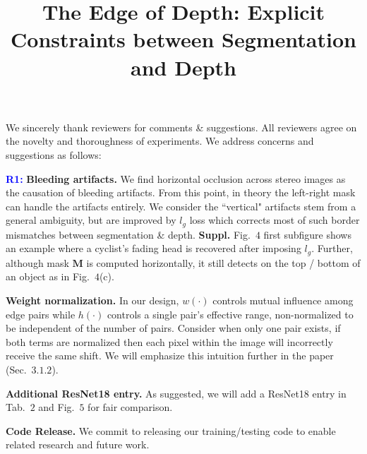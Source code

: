 \documentclass[10pt,twocolumn,letterpaper]{article}
\newcommand{\Paragraph}[1]{\vspace{0.40mm} \noindent \textbf{#1} \hspace{0mm}}
\begin{document}
\title{The Edge of Depth: Explicit Constraints between Segmentation and Depth}  %

\maketitle
\thispagestyle{empty}


\noindent We sincerely thank reviewers for comments \& suggestions.
All reviewers agree on the novelty and thoroughness of experiments. 
We address concerns and suggestions as follows:

\Paragraph{\textcolor{blue}{R1:}}
\textbf{Bleeding artifacts.} 
We find horizontal occlusion across stereo images as the causation of bleeding artifacts. 
From this point, in theory the left-right mask can handle the artifacts entirely.
We consider the ``vertical" artifacts stem from a general ambiguity, but are improved by $l_g$ loss which corrects most of such border mismatches between segmentation \& depth. 
\textbf{Suppl.} Fig.~$4$ first subfigure shows an example where a cyclist's fading head is recovered after imposing $l_g$. 
Further, although mask $\mathbf{M}$ is computed horizontally, it still detects on the top / bottom of an object as in Fig.~$4$(c).

\Paragraph{Weight normalization.} 
In our design, $w(\cdot)$ controls mutual influence among edge pairs while $h(\cdot)$ controls a single pair's effective range, non-normalized to be independent of the number of pairs. 
Consider when only one pair exists, if both terms are normalized then each pixel within the image will incorrectly receive the same shift.
We will emphasize this intuition further in the paper (Sec.~$3.1.2$). 

\Paragraph{Additional ResNet18 entry.} 
As suggested, we will add a ResNet18 entry in Tab.~$2$ and Fig.~$5$ for fair comparison.

\Paragraph{Code Release.} 
We commit to releasing our training/testing code to enable related research and future work. 
\end{document}

